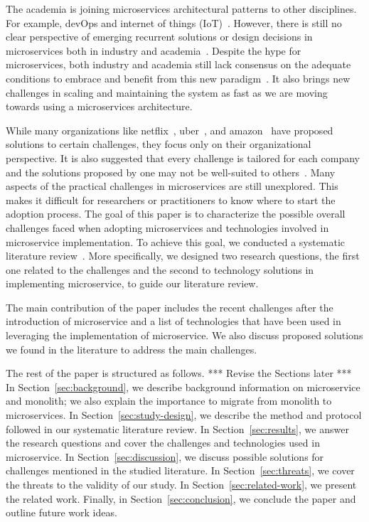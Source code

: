 The academia is joining microservices architectural patterns to other disciplines. For example, devOps and internet of things (IoT)~\cite{Osses2019}. However, there is still no clear perspective of emerging recurrent solutions or design decisions in microservices both in industry and academia~\cite{Soldani2018}. Despite the hype for microservices, both industry and academia still lack consensus on the adequate conditions to embrace and benefit from this new paradigm~\cite{Dragoni2017}. It also brings new challenges in scaling and maintaining the system as fast as we are moving towards using a microservices architecture.

While many organizations like netflix~\cite{Meshenberg2016}, uber~\cite{Uber}, and amazon~\cite{Amazon} have proposed solutions to certain challenges, they focus only on their organizational perspective. It is also suggested that every challenge is tailored for each company and the solutions proposed by one may not be well-suited to others~\cite{Kevin2015}. Many aspects of the practical challenges in microservices are still unexplored. This makes it difficult for researchers or practitioners to know where to start the adoption process. The goal of this paper is to characterize the possible overall challenges faced when adopting microservices and technologies involved in microservice implementation. To achieve this goal, we conducted a systematic literature review~\cite{Kitchenham2007}. More specifically, we designed two research questions, the first one related to the challenges and the second to technology solutions in implementing microservice, to guide our literature review. 

The main contribution of the paper includes the recent challenges after the introduction of microservice and a list of technologies that have been used in leveraging the implementation of microservice. We also discuss proposed solutions we found in the literature to address the main challenges.

The rest of the paper is structured as follows. *** Revise the Sections later *** In Section~\ref{sec:background}, we describe background information on microservice and monolith; we also explain the importance to migrate from monolith to microservices. In Section~\ref{sec:study-design}, we describe the method and protocol followed in our systematic literature review. In Section~\ref{sec:results}, we answer the research questions and cover the challenges and technologies used in microservice. In Section~\ref{sec:discussion}, we discuss possible solutions for challenges mentioned in the studied literature. In Section~\ref{sec:threats}, we cover the threats to the validity of our study. In Section~\ref{sec:related-work}, we present the related work. Finally, in Section~\ref{sec:conclusion}, we conclude the paper and outline future work ideas.



